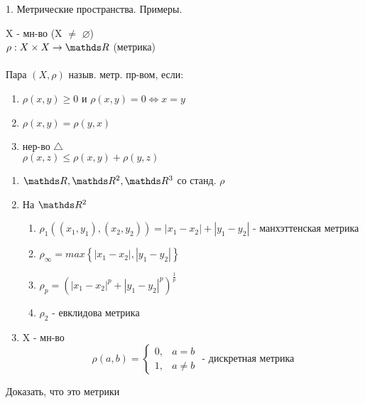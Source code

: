 \documentclass[11pt, fleqn]{article}
\begin{document}
    \begin{question}{1. Метрические пространства. Примеры.}
        \begin{definition}
            X - мн-во (X $\neq$ $\varnothing$) \\
            $\rho: X \times X \rightarrow \R$ (метрика)\\ \\
            Пара $(X, \rho)$ назыв. метр. пр-вом, если:
            \begin{enumerate}
                \item $\rho(x, y) \geq 0$ и $\rho(x, y) = 0 \Leftrightarrow x = y$
                \item $\rho(x, y) = \rho(y, x)$
                \item нер-во $\bigtriangleup$ \\ $\rho(x, z) \leq \rho(x, y) + \rho(y, z)$
            \end{enumerate}
        \end{definition}

        \begin{examples}
            \begin{enumerate}
                \item $\R, \R^2, \R^3$ со станд. $\rho$
                \item На $\R^2$
                \begin{enumerate}
                  \item $\rho_1((x_1, y_1), (x_2, y_2)) = |x_1 - x_2| + |y_1 - y_2|$ - манхэттенская метрика
                  \item $\rho_\infty = max\left\{|x_1 - x_2|, |y_1 - y_2|\right\}$
                  \item $\rho_p = (|x_1 - x_2|^p + |y_1 - y_2|^p)^{\frac{1}{p}}$
                  \item $\rho_2 \text{ - евклидова метрика}$
                \end{enumerate}
                \item X - мн-во\\
                    \[\rho(a, b) =  \begin{cases}
                            0, &a = b\\
                            1, &a \neq b
                                \end{cases}\text{ - дискретная метрика}\]
            \end{enumerate}
        \end{examples}

        \begin{upr}
          Доказать, что это метрики
        \end{upr}

    \end{question}
\end{document}
